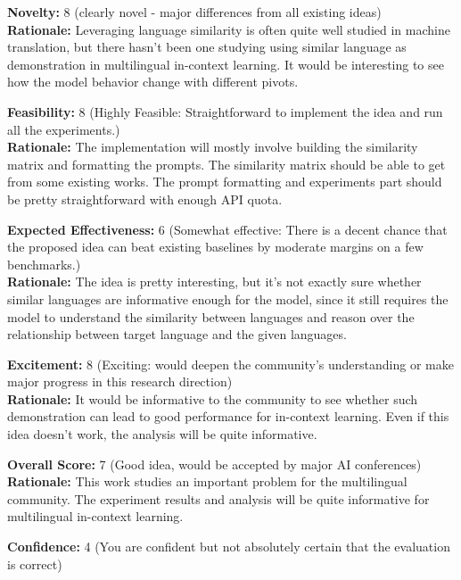 \begin{tcolorbox}[colback=green!10!white, colframe=green!80!black, title=\textbf{Reviewer 3}]
\small
\textbf{Novelty:} 8 (clearly novel - major differences from all existing ideas)\\
\textbf{Rationale:} Leveraging language similarity is often quite well studied in machine translation, but there hasn't been one studying using similar language as demonstration in multilingual in-context learning. It would be interesting to see how the model behavior change with different pivots.

\vspace{10pt}

\textbf{Feasibility:} 8 (Highly Feasible: Straightforward to implement the idea and run all the experiments.)\\
\textbf{Rationale:} The implementation will mostly involve building the similarity matrix and formatting the prompts. The similarity matrix should be able to get from some existing works. The prompt formatting and experiments part should be pretty straightforward with enough API quota.

\vspace{10pt}

\textbf{Expected Effectiveness:} 6 (Somewhat effective: There is a decent chance that the proposed idea can beat existing baselines by moderate margins on a few benchmarks.)\\
\textbf{Rationale:} The idea is pretty interesting, but it's not exactly sure whether similar languages are informative enough for the model, since it still requires the model to understand the similarity between languages and reason over the relationship between target language and the given languages.

\vspace{10pt}

\textbf{Excitement:} 8 (Exciting: would deepen the community's understanding or make major progress in this research direction)\\
\textbf{Rationale:} It would be informative to the community to see whether such demonstration can lead to good performance for in-context learning. Even if this idea doesn't work, the analysis will be quite informative.

\vspace{10pt}

\textbf{Overall Score:} 7 (Good idea, would be accepted by major AI conferences)\\
\textbf{Rationale:} This work studies an important problem for the multilingual community. The experiment results and analysis will be quite informative for multilingual in-context learning.

\vspace{10pt}

\textbf{Confidence:} 4 (You are confident but not absolutely certain that the evaluation is correct)
\end{tcolorbox}


